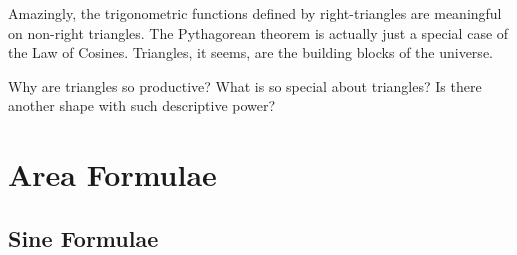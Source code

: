 

Amazingly, the trigonometric functions defined by right-triangles are
meaningful on non-right triangles.  The Pythagorean theorem is actually
just a special case of the Law of Cosines.  Triangles, it seems, are the
building blocks of the universe.

Why are triangles so productive?  What is so special about triangles?
Is there another shape with such descriptive power?

\newpage
\chapterminitoc


\newpage
\section{Area Formulae}
\noindent{}
\subsection{Sine Formulae}
